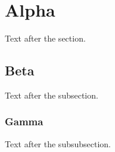 \documentclass{article}
\begin{document}
\section{Alpha}
Text after the section.
\subsection{Beta}
Text after the subsection.
\subsubsection{Gamma}
Text after the subsubsection.
\end{document}
